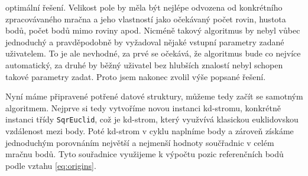 \documentclass[11pt,twoside,a4paper]{book}
\begin{document}
optimální řešení. Velikost pole by měla být nejlépe odvozena od konkrétního zpracovávaného mračna a jeho vlastností jako očekávaný počet rovin, hustota bodů, počet bodů mimo roviny apod. Nicméně takový algoritmus by nebyl vůbec jednoduchý a pravděpodobně by vyžadoval nějaké vstupní parametry zadané uživatelem. To je ale nevhodné, za prvé se očekává, že algoritmus bude co nejvíce automatický, za druhé by běžný uživatel bez hlubších znalostí nebyl schopen takové parametry zadat. Proto jsem nakonec zvolil výše popsané řešení.

Nyní máme připravené potřené datové struktury, můžeme tedy začít se samotným algoritmem. Nejprve si tedy vytvoříme novou instanci kd-stromu, konkrétně instanci třídy \verb|SqrEuclid|, což je kd-strom, který využvívá klasickou euklidovskou vzdálenost mezi body. Poté kd-strom  v cyklu naplníme body a zároveň získáme jednoduchým porovnáním  největší a nejmenší hodnoty součřadnic v celém mračnu bodů. Tyto souřadnice využijeme k výpočtu pozic referenčních bodů podle vztahu \ref{eq:origins}.
\end{document}
